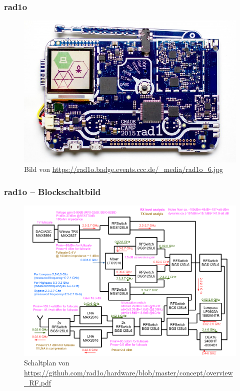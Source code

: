 \begin{frame}
  \frametitle{rad1o}
  \begin{center}
    \begin{figure}
      \includegraphics[width=1\textwidth,height=.75\textheight,keepaspectratio]{e15/rad1o.jpg}
      \caption{Bild von \ExternalLink\url{https://rad1o.badge.events.ccc.de/_media/rad1o_6.jpg}}
    \end{figure}
  \end{center}
\end{frame}

\begin{frame}
  \frametitle{rad1o -- Blockschaltbild}
  \begin{center}
    \begin{figure}
      \includegraphics[width=1\textwidth,height=.75\textheight,keepaspectratio]{e15/rad1o_block.pdf}
      \caption{Schaltplan von \ExternalLink\url{https://github.com/rad1o/hardware/blob/master/concept/overview_RF.pdf}}
    \end{figure}
  \end{center}
\end{frame}

